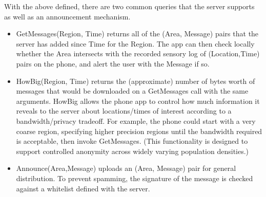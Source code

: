 \documentclass{article}
\begin{document}
With the above defined, there are two common queries that the server supports as well as an announcement mechanism.
\begin{itemize}
    \item GetMessages(Region, Time) returns all of the (Area, Message) pairs that the server has added since Time for the Region. The app can then check locally whether the Area intersects with the recorded sensory log of (Location,Time) pairs on the phone, and alert the user with the Message if so.   
    \item HowBig(Region, Time) returns the (approximate) number of bytes worth of messages that would be downloaded on a GetMessages call with the same arguments.  HowBig allows the phone app to control how much information it reveals to the server about locations/times of interest according to a bandwidth/privacy tradeoff.  For example, the phone could start with a very coarse region, specifying higher precision regions until the bandwidth required is acceptable, then invoke GetMessages.  (This functionality is designed to support controlled anonymity across widely varying population densities.)
    \item Announce(Area,Message) uploads an (Area, Message) pair for general distribution.  To prevent spamming, the signature of the message is checked against a whitelist defined with the server. 
\end{itemize}
\end{document}
